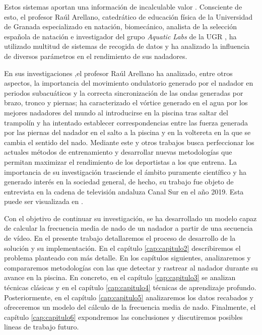 Estos sistemas aportan una información de incalculable valor \cite{rolecience}. Consciente de esto, el profesor Raúl Arellano, catedrático de educación física de la Universidad de Granada especializado en natación, biomecánico, analista de la selección española de natación e investigador del grupo \textit{Aquatic Labs} de la UGR \cite{aquaticlabs}, ha utilizado multitud de sistemas de recogida de datos y ha analizado la influencia de diversos parámetros en el rendimiento de sus nadadores. 

En sus investigaciones \cite{raulvortice} \cite{raulonda} \cite{raulpropulsion},el profesor Raúl Arellano ha analizado, entre otros aspectos, la importancia del movimiento ondulatorio generado por el nadador en periodos subacuáticos y la correcta sincronización de las ondas generadas por brazo, tronco y piernas; ha caracterizado el vórtice generado en el agua por los mejores nadadores del mundo al introducirse en la piscina tras saltar del trampolín y ha intentado establecer correspondencias entre las fuerza generada por las piernas del nadador en el salto a la piscina y en la voltereta en la que se cambia el sentido del nado. Mediante este y otros trabajos busca perfeccionar los actuales métodos de entrenamiento y desarrollar nuevas metodologías que permitan maximizar el rendimiento de los deportistas a los que entrena. La importancia de su investigación trasciende el ámbito puramente científico y ha generado interés en la sociedad general, de hecho, su trabajo fue objeto de entrevista en la cadena de televisión andaluza Canal Sur en el año 2019. Esta puede ser visualizada en \cite{entrevistaraul}.

Con el objetivo de continuar su investigación, se ha desarrollado un modelo capaz de calcular la frecuencia media de nado de un nadador a partir de una secuencia de vídeo. En el presente trabajo detallaremos el proceso de desarrollo de la solución y su implementación. En el capítulo \ref{cap:capitulo2} describiremos el problema planteado con más detalle. En los capítulos siguientes, analizaremos y compararemos metodologías con las que detectar y rastrear al nadador durante su avance en la piscina. En concreto, en el capítulo \ref{cap:capitulo3} se analizan técnicas clásicas y en el capítulo \ref{cap:capitulo4} técnicas de aprendizaje profundo. Posteriormente, en el capítulo \ref{cap:capitulo5} analizaremos los datos recabados y ofreceremos un modelo del cálculo de la frecuencia media de nado. Finalmente, el capítulo \ref{cap:capitulo6} expondremos las conclusiones y discutiremos posibles lineas de trabajo futuro.
